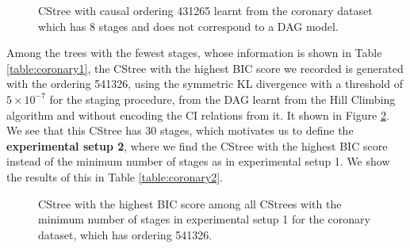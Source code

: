 \documentclass{tufte-book}
\begin{document}
\begin{figure}[]\label{fig:coronary_minstages_nodag}
   \begin{floatrow}
%
\caption{CStree with causal ordering 431265 learnt from the coronary dataset which has 8 stages and does not correspond to a DAG model.}
        
   \end{floatrow}
\end{figure}

Among the trees with the fewest stages, whose information is shown in Table \ref{table:coronary1}, the CStree with the highest BIC score we recorded is generated with the ordering 541326, using the symmetric KL divergence with a threshold of \(5\times 10^{-7}\) for the staging procedure, from the DAG learnt from the Hill Climbing algorithm and without encoding the CI relations from it. It shown in Figure \ref{fig:coronary2}. We see that this CStree has 30 stages, which motivates us to define the \textbf{experimental setup 2}, where we find the CStree with the highest BIC score instead of the minimum number of stages as in experimental setup 1. We show the results of this in Table \ref{table:coronary2}.



\begin{figure}[]\label{fig:coronary2}
   \begin{floatrow}
%
\caption{CStree with the highest BIC score among all CStrees with the minimum number of stages in experimental setup 1 for the coronary dataset, which has ordering 541326.}
        
   \end{floatrow}
\end{figure}
\end{document}
